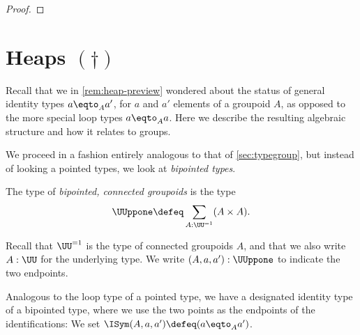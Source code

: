\begin{proof}
\end{proof}


\section{Heaps \texorpdfstring{$(\dagger)$}{(\textdagger) \color{red} just moved from symmetry without proofreading BID211116}}
\label{sec:heaps}

Recall that we in \cref{rem:heap-preview} wondered about
the status of general identity types $a\eqto_A a'$,
for $a$ and $a'$ elements of a groupoid $A$,
as opposed to the more special loop types $a\eqto_Aa$.
Here we describe the resulting algebraic structure
and how it relates to groups.

We proceed in a fashion entirely analogous to that of \cref{sec:typegroup},
but instead of looking a pointed types, we look at \emph{bipointed types}.

\begin{definition}\label{def:bipt-conn-groupoid}
  The type of \emph{bipointed, connected groupoids} is the type
  \[
    \UUppone \defeq \sum_{A:\UU^{=1}}(A \times A).\qedhere
  \]
\end{definition}
Recall that $\UU^{=1}$ is the type of connected groupoids $A$,
and that we also write $A:\UU$ for the underlying type.
We write $(A,a,a'):\UUppone$ to indicate the two endpoints.

Analogous to the loop type of a pointed type,
we have a designated identity type of a bipointed type,
where we use the two points as the endpoints of the identifications:
We set $\ISym(A,a,a') \defeq (a \eqto_A a')$.

